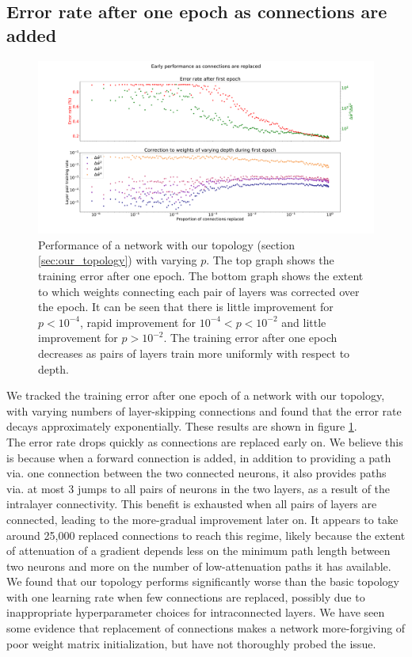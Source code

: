 \documentclass{article}
\newcommand{\npar}{\\\indent}
\begin{document}
\subsection{Error rate after one epoch as connections are added}
\label{sec:mnist_1epoch}

\begin{figure}
  \centering
  \includegraphics[width=\textwidth]{figures/MNIST_one_epoch_performance.pdf}
  \caption{Performance of a network with our topology (section \ref{sec:our_topology}) with varying $p$. The top graph shows the training error after one epoch. The bottom graph shows the extent to which weights connecting each pair of layers was corrected over the epoch. It can be seen that there is little improvement for $p<10^{-4}$, rapid improvement for $10^{-4}<p<10^{-2}$ and little improvement for $p>10^{-2}$. The training error after one epoch decreases as pairs of layers train more uniformly with respect to depth.}
  \label{fig:mnist_1epoch}
\end{figure}

We tracked the training error after one epoch of a network with our topology, with varying numbers of layer-skipping connections and found that the error rate decays approximately exponentially. These results are shown in figure \ref{fig:mnist_1epoch}.
\npar
The error rate drops quickly as connections are replaced early on. We believe this is because when a forward connection is added, in addition to providing a path via. one connection between the two connected neurons, it also provides paths via. at most 3 jumps to all pairs of neurons in the two layers, as a result of the intralayer connectivity. This benefit is exhausted when all pairs of layers are connected, leading to the more-gradual improvement later on. It appears to take around 25,000 replaced connections to reach this regime, likely because the extent of attenuation of a gradient depends less on the minimum path length between two neurons and more on the number of low-attenuation paths it has available.
\npar
We found that our topology performs significantly worse than the basic topology with one learning rate when few connections are replaced, possibly due to inappropriate hyperparameter choices for intraconnected layers. We have seen some evidence that replacement of connections makes a network more-forgiving of poor weight matrix initialization, but have not thoroughly probed the issue.
\end{document}
